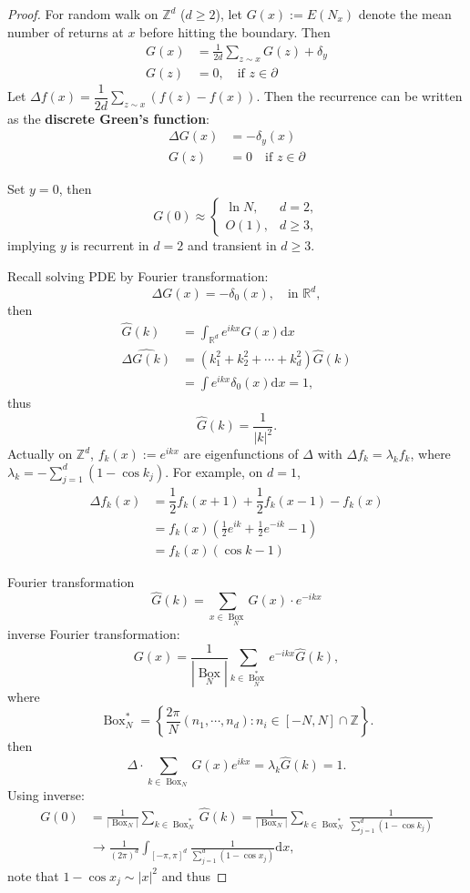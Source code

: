 \documentclass[11pt,singlecolumn, openany, citestyle=authoryear]{elegantbook}
\begin{document}
\begin{CJK}{UTF8}{gbsn}
\begin{proof}
For random walk on $\mathbb{Z}^d$ ($d\geqslant 2$),
let $G(x):=E(N_x)$ denote the mean number of returns at $x$ before hitting the boundary.
Then 
\begin{align*}
    G(x)&=\frac{1}{2d}\sum_{z\sim x}G(z)+\delta_y\\
    G(z)&=0, \quad \text{if } z \in \partial 
\end{align*}
Let $\Delta f(x)=\dfrac{1}{2d}\displaystyle \sum_{z\sim x}(f(z)-f(x))$.
Then the recurrence can be written as the \textbf{discrete Green's function}:
\begin{align*}
\Delta G(x) &= -\delta_y(x)\\
G(z)&=0 \quad \text{if } z \in \partial
\end{align*}
\begin{lemma}
    Set $y=0$, then 
    $$
    G(0) \approx 
    \begin{cases}
        \ln N, & d =2, \\
        O(1), & d\geqslant 3,
    \end{cases}
    $$
    implying $y$ is recurrent in $d=2$ and transient in $d\geqslant 3$.
\end{lemma}
Recall solving PDE by Fourier transformation:
$$
\Delta G(x)=-\delta_0(x), \quad \text{in } \mathbb{R}^d,
$$
then 
\begin{align*}
\hat{G}(k)&=\int_{\mathbb{R}^d} e^{ikx}G(x)\mathrm{d}x \\
\hat{\Delta G(k)} &= (k_1^2+k_2^2+\cdots+k_d^2) \hat{G}(k) \\
&= \int e^{ikx}\delta_0(x)\mathrm{d}x = 1,
\end{align*}
thus 
$$
\hat{G}(k) = \frac{1}{|k|^2}.
$$
Actually on $\mathbb{Z}^d$, $f_k(x):=e^{ikx}$ are eigenfunctions of $\Delta$ with 
$\Delta f_k = \lambda_k f_k$, where $\lambda_k=-\displaystyle \sum_{j=1}^d (1-\cos k_j)$.
For example, on $d=1$, 
\begin{align*}
\Delta f_k(x) &= \dfrac{1}{2}f_k(x+1)+\dfrac{1}{2}f_k(x-1)-f_k(x)\\
&= f_k(x)\left(\frac{1}{2}e^{ik}+\frac{1}{2}e^{-ik}-1\right)\\
&=f_k(x)(\cos k-1)
\end{align*} 

Fourier transformation
$$
    \hat{G}(k)=\sum_{x\in \operatorname*{Box}_N} G(x)\cdot e^{-ikx} 
$$
inverse Fourier transformation:
$$
G(x)=\frac{1}{|\operatorname*{Box}_N|}\sum_{k\in \operatorname*{Box}^*_N} 
e^{-ikx}\hat{G}(k),
$$
where 
$$
\operatorname{Box}^*_N = \left\{\frac{2\pi}{N}(n_1,\cdots,n_d):
n_i \in [-N,N] \cap \mathbb{Z}\right\}.
$$
then
$$
    \Delta \cdot \sum_{k\in\operatorname{Box}_N} G(x)e^{ikx}=
    \lambda_k \hat{G}(k) = 1. 
$$
Using inverse:
\begin{align*}
G(0)&=\frac{1}{|\operatorname{Box}_N|}
\sum_{k\in\operatorname{Box}_N^*} \hat{G}(k)
=\frac{1}{|\operatorname{Box}_N|} \sum_{k\in\operatorname{Box}_N^*} \frac{1}{\sum_{j=1}^d (1-\cos k_j)}\\
&\to \frac{1}{(2\pi)^d} \int_{[-\pi,\pi]^d} \frac{1}{\sum_{j=1}^d (1-\cos x_j)}\mathrm{d}x,
\end{align*}
note that $1-\cos x_j\sim |x|^2$ and thus 
\end{proof}


\end{CJK}
\end{document}
